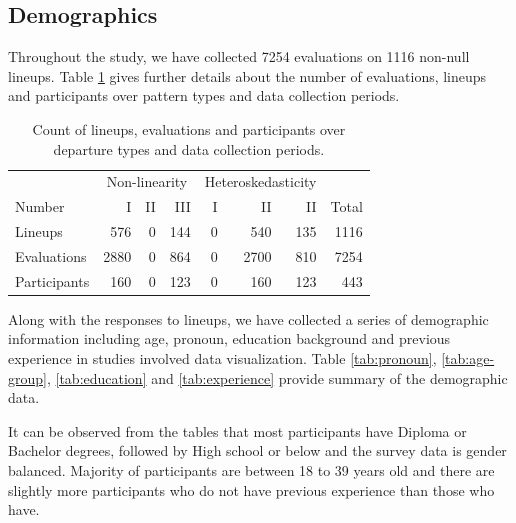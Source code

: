 \documentclass[]{interact}
\theoremstyle{plain}%
\theoremstyle{definition}
\theoremstyle{remark}
\begin{document}
\hypertarget{demographics}{%
\subsection{Demographics}\label{demographics}}

Throughout the study, we have collected 7254 evaluations on 1116
non-null lineups. Table \ref{tab:count-lineup} gives further details
about the number of evaluations, lineups and participants over pattern
types and data collection periods.

\begin{table}

\caption{\label{tab:count-lineup}Count of lineups, evaluations and participants over departure types and data collection periods.}
\centering
\begin{tabular}[t]{lrrrrrrr}
\toprule
\multicolumn{1}{c}{ } & \multicolumn{3}{c}{Non-linearity} & \multicolumn{3}{c}{Heteroskedasticity} \\
\cmidrule(l{3pt}r{3pt}){2-4} \cmidrule(l{3pt}r{3pt}){5-7}
Number & I & II & III & I & II & II & Total\\
\midrule
Lineups & 576 & 0 & 144 & 0 & 540 & 135 & 1116\\
Evaluations & 2880 & 0 & 864 & 0 & 2700 & 810 & 7254\\
Participants & 160 & 0 & 123 & 0 & 160 & 123 & 443\\
\bottomrule
\end{tabular}
\end{table}

Along with the responses to lineups, we have collected a series of
demographic information including age, pronoun, education background and
previous experience in studies involved data visualization. Table
\ref{tab:pronoun}, \ref{tab:age-group}, \ref{tab:education} and
\ref{tab:experience} provide summary of the demographic data.

It can be observed from the tables that most participants have Diploma
or Bachelor degrees, followed by High school or below and the survey
data is gender balanced. Majority of participants are between 18 to 39
years old and there are slightly more participants who do not have
previous experience than those who have.

\begin{table}

\caption{\label{tab:pronoun}Summary of pronoun distribution of participants recruited in this study.}
\centering
{}
\end{table}
\end{document}
